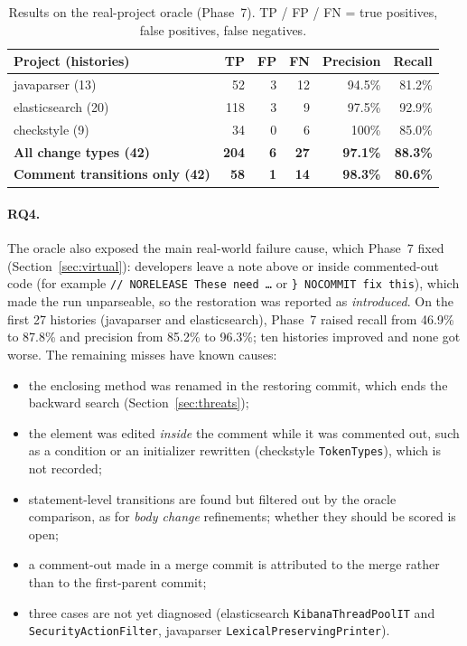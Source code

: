 \documentclass[11pt,a4paper]{article}
\newcommand{\code}[1]{\texttt{#1}}
\newcommand{\change}[1]{\textit{#1}}
\begin{document}
\begin{table}[h]
\centering\small
\caption{Results on the real-project oracle (Phase~7). TP / FP / FN = true positives, false positives, false negatives.}
\label{tab:realoracle}
\begin{tabular}{@{}lrrrrr@{}}
\toprule
Project (histories) & TP & FP & FN & Precision & Recall \\
\midrule
javaparser (13) & 52 & 3 & 12 & 94.5\% & 81.2\% \\
elasticsearch (20) & 118 & 3 & 9 & 97.5\% & 92.9\% \\
checkstyle (9) & 34 & 0 & 6 & 100\% & 85.0\% \\
\midrule
\textbf{All change types (42)} & \textbf{204} & \textbf{6} & \textbf{27} & \textbf{97.1\%} & \textbf{88.3\%} \\
\textbf{Comment transitions only (42)} & \textbf{58} & \textbf{1} & \textbf{14} & \textbf{98.3\%} & \textbf{80.6\%} \\
\bottomrule
\end{tabular}
\end{table}

\paragraph{RQ4.} The oracle also exposed the main real-world failure cause, which Phase~7 fixed (Section~\ref{sec:virtual}): developers leave a note above or inside commented-out code (for example \code{// NORELEASE These need \ldots} or \code{\} NOCOMMIT fix this}), which made the run unparseable, so the restoration was reported as \change{introduced}. On the first 27 histories (javaparser and elasticsearch), Phase~7 raised recall from 46.9\% to 87.8\% and precision from 85.2\% to 96.3\%; ten histories improved and none got worse. The remaining misses have known causes:
\begin{itemize}
  \item the enclosing method was renamed in the restoring commit, which ends the backward search (Section~\ref{sec:threats});
  \item the element was edited \emph{inside} the comment while it was commented out, such as a condition or an initializer rewritten (checkstyle \code{TokenTypes}), which is not recorded;
  \item statement-level transitions are found but filtered out by the oracle comparison, as for \change{body change} refinements; whether they should be scored is open;
  \item a comment-out made in a merge commit is attributed to the merge rather than to the first-parent commit;
  \item three cases are not yet diagnosed (elasticsearch \code{KibanaThreadPoolIT} and \code{SecurityActionFilter}, javaparser \code{LexicalPreservingPrinter}).
\end{itemize}
\end{document}
